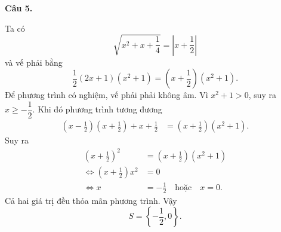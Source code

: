 \documentclass[12pt,a4paper]{article}
\begin{document}
\textbf{Câu 5.}

Ta có
\[
\sqrt{x^2+x+\frac14}=\left|x+\frac12\right|
\]
và vế phải bằng
\[
\frac12(2x+1)(x^2+1)=\left(x+\frac12\right)(x^2+1).
\]
Để phương trình có nghiệm, vế phải phải không âm. Vì $x^2+1>0$, suy ra
$x\ge-\dfrac12$. Khi đó phương trình tương đương
\begin{align*}
\left(x-\frac12\right)\left(x+\frac12\right)+x+\frac12
&=\left(x+\frac12\right)(x^2+1).
\end{align*}
Suy ra
\begin{align*}
\left(x+\frac12\right)^2
&=\left(x+\frac12\right)(x^2+1)\\
\Longleftrightarrow
\left(x+\frac12\right)x^2&=0\\
\Longleftrightarrow x&=-\frac12\quad\text{hoặc}\quad x=0.
\end{align*}
Cả hai giá trị đều thỏa mãn phương trình. Vậy
\[
\boxed{S=\left\{-\frac12,0\right\}}.
\]
\end{document}
